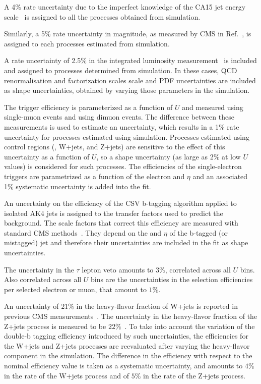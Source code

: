 A 4\% rate uncertainty due to the imperfect knowledge of the CA15 jet energy scale~\cite{jec} is assigned to all the processes obtained from simulation.

Similarly, a 5\% rate uncertainty in \ptmiss magnitude, as measured by CMS in Ref.~\cite{Khachatryan:2014gga}, is assigned to each processes estimated from simulation.

A rate uncertainty of 2.5\% in the integrated luminosity measurement~\cite{CMS-PAS-LUM-17-001} is included and assigned to processes determined from simulation. In these cases, QCD renormalisation and factorization scales scale and PDF uncertainties are included as shape uncertainties, obtained by varying those parameters in the simulation.%

The \MET trigger efficiency is parameterized as a function of $U$ and measured using single-muon events and using dimuon events. 
The difference between these measurements is used to estimate an uncertainty, which results in a 1\% rate uncertainty for processes estimated using simulation.
Processes estimated using control regions (\ttbar, W+jets, and Z+jets) are sensitive to the effect of this uncertainty as a function of $U$, so a shape uncertainty (as large as 2\% at low $U$ values) is considered for such processes.
The efficiencies of the single-electron triggers are parametrized as a function of the electron \pt and $\eta$ and an associated 1\% systematic uncertainty is added into the fit.

An uncertainty on the efficiency of the CSV b-tagging algorithm applied to isolated AK4 jets is assigned to the transfer factors used to predict the \ttbar background. The scale factors that correct this efficiency are measured with standard CMS methods~\cite{Sirunyan:2017ezt}. They depend on the \pt and $\eta$ of the b-tagged (or mistagged) jet and therefore their uncertainties are included in the fit as shape uncertainties.

The uncertainty in the $\tau$ lepton veto amounts to $3\%$, correlated across all $U$ bins. Also correlated across all $U$ bins are the uncertainties in the selection efficiencies per selected electron or muon, that amount to $1\%$.

An uncertainty of $21\%$ in the heavy-flavor fraction of W+jets is reported in previous CMS measurements~\cite{Khachatryan:2014uva,Chatrchyan:2013uza}. The uncertainty in the heavy-flavor fraction of the Z+jets process is measured to be $22\%$~\cite{Khachatryan:2014zya,Chatrchyan:2014dha}. To take into account the variation of the double-b tagging efficiency introduced by such uncertainties, the efficiencies for the W+jets and Z+jets processes are reevaluated after varying the heavy-flavor component in the simulation. The difference in the efficiency with respect to the nominal efficiency value is taken as a systematic uncertainty, and amounts to $4\%$ in the rate of the W+jets process and of $5\%$ in the rate of the Z+jets process. 

